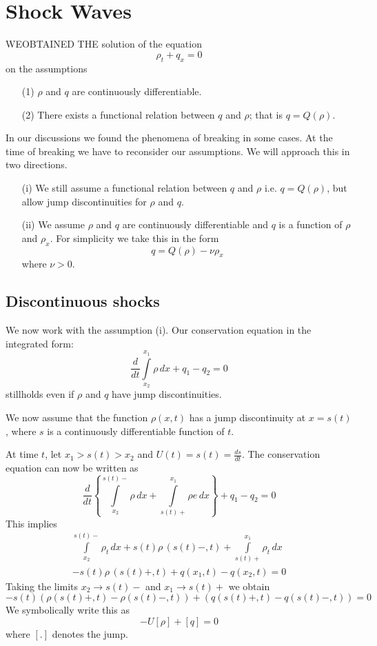 
\chapter{Shock Waves}\label{chap3}

WE\pageoriginale OBTAINED THE solution of the equation
$$
\rho_t+q_x=0
$$
on the assumptions
\begin{itemize}
\item [(1)] $\rho$ and $q$ are continuously differentiable.

\item [(2)] There exists a functional relation between $q$ and $\rho$; that is $q=Q(\rho)$. 
\end{itemize}

In our discussions we found the phenomena of breaking in some cases. At the time of breaking we have to reconsider our assumptions. We will approach this in two directions.
\begin{itemize}
\item [(i)] We still assume a functional relation between $q$ and $\rho$ i.e. $q = Q(\rho)$, but allow jump discontinuities for $\rho$ and $q$.

\item [(ii)] We assume $\rho$ and $q$ are continuously differentiable and $q$ is a function of $\rho$ and $\rho_x$. For simplicity we take this in the form
$$
q=Q(\rho)-\nu\rho_x 
$$
where $\nu >0$. 
\end{itemize}

\section{Discontinuous shocks}\label{chap2:sec3.1}

We now work with the assumption (i). Our conservation equation in the integrated form:
$$
\frac{d}{dt}\int\limits_{x_2}^{x_1}\rho\,dx+q_1-q_2=0
$$
still\pageoriginale holds even if $\rho$ and $q$ have jump discontinuities.

We now assume that the function $\rho(x,t)$ has a jump discontinuity at $x=s(t)$, where $s$ is a continuously differentiable function of $t$.

At time $t$, let $x_1>s(t)>x_2$ and $U(t)=s(t)=\frac{ds}{dt}$. The conservation equation can now be written as 
$$
\frac{d}{dt}\left\{\int\limits_{x_2}^{s(t)-}\rho\,dx+\int\limits_{s(t)+}^{x_1}\rho e\,dx\right\}+q_1-q_2=0
$$
This implies
\begin{gather*}
\int\limits_{x_2}^{s(t)-}\rho_t\,dx+s(t)\rho\,(s(t)-,t)+\int\limits_{s(t)+}^{x_1} \rho_t\,dx\\
-s(t)\rho \,(s(t)+,t)+q(x_1,t)-q(x_2,t)=0
\end{gather*}
Taking the limits $x_2\to s(t)-$ and $x_1\to s(t)+$ we obtain 
$$
-s(t)(\rho(s(t)+,t)-\rho(s(t)-,t))+(q(s(t)+,t)-q(s(t)-,t))=0
$$
We symbolically write this as
\begin{equation}
-U[\rho]+[q]=0\tag{3.1}\label{chap3:eq3.1}
\end{equation}
where $[.]$ denotes the jump.

